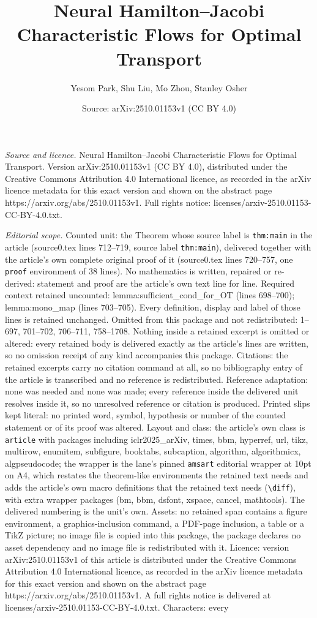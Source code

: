 \documentclass[10pt,a4paper]{amsart}
\title[Neural Hamilton--Jacobi Characteristic Flows for Optimal Tra]{Neural Hamilton--Jacobi Characteristic Flows for Optimal Transport}
\author{Yesom Park, Shu Liu, Mo Zhou, Stanley Osher}
\date{Source: arXiv:2510.01153v1 (CC BY 4.0)}
\begin{document}
\maketitle

\noindent\emph{Source and licence.} Neural Hamilton--Jacobi Characteristic Flows for Optimal Transport. Version arXiv:2510.01153v1 (CC BY 4.0), distributed under the Creative Commons Attribution 4.0 International licence, as recorded in the arXiv licence metadata for this exact version and shown on the abstract page https://arxiv.org/abs/2510.01153v1. Full rights notice: licenses/arxiv-2510.01153-CC-BY-4.0.txt.\par\smallskip

\noindent\textit{Editorial scope.} Counted unit: the Theorem whose source label is \texttt{thm:main} in the article (source0.tex lines 712--719, source label \texttt{thm:main}), delivered together with the article's own complete original proof of it (source0.tex lines 720--757, one \texttt{proof} environment of 38 lines). No mathematics is written, repaired or re-derived: statement and proof are the article's own text line for line. Required context retained uncounted: lemma:sufficient\_cond\_for\_OT (lines 698--700); lemma:mono\_map (lines 703--705). Every definition, display and label of those lines is retained unchanged. Omitted from this package and not redistributed: 1--697, 701--702, 706--711, 758--1708. Nothing inside a retained excerpt is omitted or altered: every retained body is delivered exactly as the article's lines are written, so no omission receipt of any kind accompanies this package. Citations: the retained excerpts carry no citation command at all, so no bibliography entry of the article is transcribed and no reference is redistributed. Reference adaptation: none was needed and none was made; every reference inside the delivered unit resolves inside it, so no unresolved reference or citation is produced. Printed slips kept literal: no printed word, symbol, hypothesis or number of the counted statement or of its proof was altered. Layout and class: the article's own class is \texttt{article} with packages including iclr2025\_arXiv, times, bbm, hyperref, url, tikz, multirow, enumitem, subfigure, booktabs, subcaption, algorithm, algorithmicx, algpseudocode; the wrapper is the lane's pinned \texttt{amsart} editorial wrapper at 10pt on A4, which restates the theorem-like environments the retained text needs and adds the article's own macro definitions that the retained text needs (\texttt{\textbackslash diff}), with extra wrapper packages (bm, bbm, dsfont, xspace, cancel, mathtools). The delivered numbering is the unit's own. Assets: no retained span contains a figure environment, a graphics-inclusion command, a PDF-page inclusion, a table or a TikZ picture; no image file is copied into this package, the package declares no asset dependency and no image file is redistributed with it. Licence: version arXiv:2510.01153v1 of this article is distributed under the Creative Commons Attribution 4.0 International licence, as recorded in the arXiv licence metadata for this exact version and shown on the abstract page https://arxiv.org/abs/2510.01153v1. A full rights notice is delivered at licenses/arxiv-2510.01153-CC-BY-4.0.txt. Characters: every 
\end{document}
